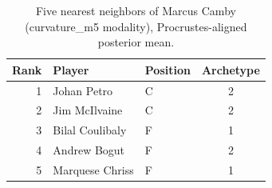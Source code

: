 \begin{table}[htbp]
  \centering\small
  \begin{tabular}{rllc}
    \toprule
    Rank & Player & Position & Archetype \\
    \midrule
    1 & Johan Petro & C & 2 \\
    2 & Jim McIlvaine & C & 2 \\
    3 & Bilal Coulibaly & F & 1 \\
    4 & Andrew Bogut & F & 2 \\
    5 & Marquese Chriss & F & 1 \\
    \bottomrule
  \end{tabular}
  \caption{Five nearest neighbors of Marcus Camby (curvature_m5 modality), Procrustes-aligned posterior mean.}
  \label{tab:Marcus_Camby_neighbors_curvature_m5}
\end{table}

